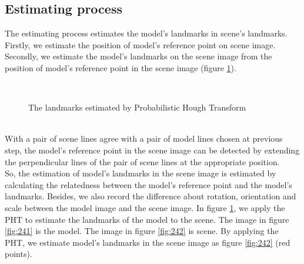 \subsection{Estimating process}
The estimating process estimates the model's landmarks in scene's landmarks. Firstly, we estimate the position of model's reference point on scene image. Secondly, we estimate the model's landmarks on the scene image from the position of model's reference point in the scene image (figure \ref{fig:24}).
\begin{figure}[h!]
\centering
{}~~
\caption{The landmarks estimated by Probabilistic Hough Transform}
\label{fig:24}
\end{figure}~\\
With a pair of scene lines agree with a pair of model lines chosen at previous step, the model's reference point in the scene image can be detected by extending the perpendicular lines of the pair of scene lines at the appropriate position\cite{ashbrook1995robust}.\\[0.2cm]
So, the estimation of model's landmarks in the scene image is estimated by calculating the relatedness between the model's reference point and the model's landmarks. Besides, we also record the difference about rotation, orientation and scale between the model image and the scene image.
In figure \ref{fig:24}, we apply the PHT to estimate the landmarks of the model to the scene. The image in figure \ref{fig:241} is the model. The image in figure \ref{fig:242} is scene. By applying the PHT, we estimate model's landmarks in the scene image as figure \ref{fig:242} (red points).
